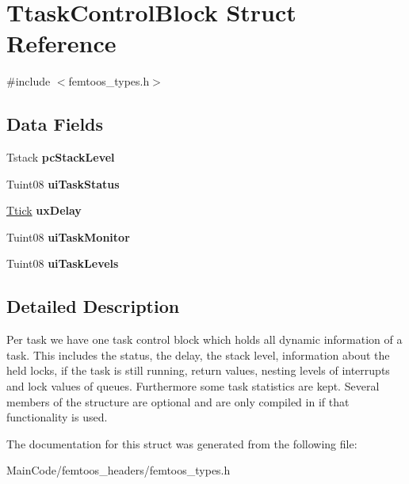 \hypertarget{struct_ttask_control_block}{\section{Ttask\-Control\-Block Struct Reference}
\label{struct_ttask_control_block}
}


{\ttfamily \#include $<$femtoos\-\_\-types.\-h$>$}

\subsection*{Data Fields}
\begin{DoxyCompactItemize}
\item 
\hypertarget{struct_ttask_control_block_ae07c1c1c282861b77fbf92d7f318cf27}{Tstack {\bfseries pc\-Stack\-Level}}\label{struct_ttask_control_block_ae07c1c1c282861b77fbf92d7f318cf27}

\item 
\hypertarget{struct_ttask_control_block_ad61a88ca7207c2b8c5d1b0fff3b5919d}{Tuint08 {\bfseries ui\-Task\-Status}}\label{struct_ttask_control_block_ad61a88ca7207c2b8c5d1b0fff3b5919d}

\item 
\hypertarget{struct_ttask_control_block_a51012b67b50690905ea6ad0db3ea5db4}{\hyperlink{union_ttick}{Ttick} {\bfseries ux\-Delay}}\label{struct_ttask_control_block_a51012b67b50690905ea6ad0db3ea5db4}

\item 
\hypertarget{struct_ttask_control_block_a4d1597e86ec08850e7e2f4cc9aca7115}{Tuint08 {\bfseries ui\-Task\-Monitor}}\label{struct_ttask_control_block_a4d1597e86ec08850e7e2f4cc9aca7115}

\item 
\hypertarget{struct_ttask_control_block_a19de8fdd4a90ba7bd4be2eef48ba0e19}{Tuint08 {\bfseries ui\-Task\-Levels}}\label{struct_ttask_control_block_a19de8fdd4a90ba7bd4be2eef48ba0e19}

\end{DoxyCompactItemize}


\subsection{Detailed Description}
Per task we have one task control block which holds all dynamic information of a task. This includes the status, the delay, the stack level, information about the held locks, if the task is still running, return values, nesting levels of interrupts and lock values of queues. Furthermore some task statistics are kept. Several members of the structure are optional and are only compiled in if that functionality is used. 

The documentation for this struct was generated from the following file\-:\begin{DoxyCompactItemize}
\item 
Main\-Code/femtoos\-\_\-headers/femtoos\-\_\-types.\-h\end{DoxyCompactItemize}
